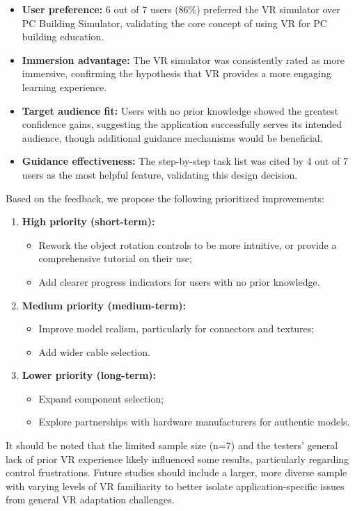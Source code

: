 \begin{itemize}
    \item \textbf{User preference:} 6 out of 7 users (86\%) preferred the VR simulator over PC Building Simulator, validating the core concept of using VR for PC building education.
    \item \textbf{Immersion advantage:} The VR simulator was consistently rated as more immersive, confirming the hypothesis that VR provides a more engaging learning experience.
    \item \textbf{Target audience fit:} Users with no prior knowledge showed the greatest confidence gains, suggesting the application successfully serves its intended audience, though additional guidance mechanisms would be beneficial.
    \item \textbf{Guidance effectiveness:} The step-by-step task list was cited by 4 out of 7 users as the most helpful feature, validating this design decision.
\end{itemize}

Based on the feedback, we propose the following prioritized improvements:

\begin{enumerate}
    \item \textbf{High priority (short-term):}
    \begin{itemize}
        \item Rework the object rotation controls to be more intuitive, or provide a comprehensive tutorial on their use;
        \item Add clearer progress indicators for users with no prior knowledge.
    \end{itemize}
    \item \textbf{Medium priority (medium-term):}
    \begin{itemize}
        \item Improve model realism, particularly for connectors and textures;
        \item Add wider cable selection.
    \end{itemize}
    \item \textbf{Lower priority (long-term):}
    \begin{itemize}
        \item Expand component selection;
        \item Explore partnerships with hardware manufacturers for authentic models.
    \end{itemize}
\end{enumerate}

It should be noted that the limited sample size (n=7) and the testers' general lack of prior VR experience likely influenced some results, particularly regarding control frustrations.
Future studies should include a larger, more diverse sample with varying levels of VR familiarity to better isolate application-specific issues from general VR adaptation challenges.
